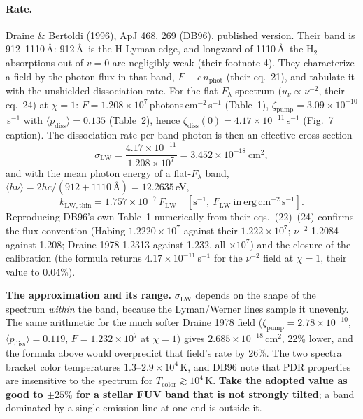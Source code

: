 \documentclass[english,a4paper]{my_memo}
\begin{document}
\paragraph{Rate.} Draine \& Bertoldi (1996), ApJ 468, 269 (DB96), published
version. Their band is 912--1110\,\AA: 912\,\AA\ is the H Lyman edge, and longward
of 1110\,\AA\ the H$_2$ absorptions out of $v=0$ are negligibly weak (their
footnote 4). They characterize a field by the photon flux in that band,
$F\equiv c\,n_\mathrm{phot}$ (their eq.~21), and tabulate it with the unshielded
dissociation rate. For the flat-$F_\lambda$ spectrum ($u_\nu\propto\nu^{-2}$,
their eq.~24) at $\chi=1$: $F=1.208\times10^{7}$\,photons\,cm$^{-2}$\,s$^{-1}$
(Table~1), $\zeta_\mathrm{pump}=3.09\times10^{-10}$\,s$^{-1}$ with
$\langle p_\mathrm{diss}\rangle=0.135$ (Table~2), hence
$\zeta_\mathrm{diss}(0)=4.17\times10^{-11}$\,s$^{-1}$ (Fig.~7 caption). The
dissociation rate per band photon is then an effective cross section
\begin{equation}
  \sigma_\mathrm{LW}=\frac{4.17\times10^{-11}}{1.208\times10^{7}}
  =3.452\times10^{-18}\ \mathrm{cm^{2}},
\end{equation}
and with the mean photon energy of a flat-$F_\lambda$ band,
$\langle h\nu\rangle = 2hc/(912+1110\,\text{\AA}) = 12.2635$\,eV,
\begin{equation}
  k_\mathrm{LW,thin} = 1.757\times10^{-7}\,F_\mathrm{LW}\quad
  [\mathrm{s^{-1}},\ F_\mathrm{LW}\ \mathrm{in\ erg\,cm^{-2}\,s^{-1}}].
\end{equation}
Reproducing DB96's own Table~1 numerically from their eqs.~(22)--(24) confirms the
flux convention (Habing $1.2220\times10^{7}$ against their $1.222\times10^{7}$;
$\nu^{-2}$ 1.2084 against 1.208; Draine 1978 1.2313 against 1.232, all
$\times10^{7}$) and the closure of the calibration (the formula returns
$4.17\times10^{-11}$\,s$^{-1}$ for the $\nu^{-2}$ field at $\chi=1$, their value
to 0.04\%).

\textbf{The approximation and its range.} $\sigma_\mathrm{LW}$ depends on the
shape of the spectrum \emph{within} the band, because the Lyman/Werner lines
sample it unevenly. The same arithmetic for the much softer Draine 1978 field
($\zeta_\mathrm{pump}=2.78\times10^{-10}$, $\langle p_\mathrm{diss}\rangle=0.119$,
$F=1.232\times10^{7}$ at $\chi=1$) gives $2.685\times10^{-18}$\,cm$^{2}$, 22\%
lower, and the formula above would overpredict that field's rate by 26\%. The two
spectra bracket color temperatures $1.3$--$2.9\times10^{4}$\,K, and DB96 note that
PDR properties are insensitive to the spectrum for $T_\mathrm{color}\gtrsim10^{4}$\,K.
\textbf{Take the adopted value as good to $\pm25\%$ for a stellar FUV band that is
not strongly tilted}; a band dominated by a single emission line at one end is
outside it.
\end{document}
